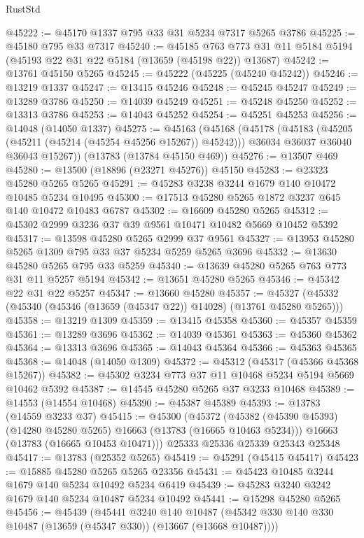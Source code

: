 \begin{lexlean}{RustStd}
\begin{coremodule}
@45222 := @45170 @1337 @795 @33 @31 @5234 @7317 @5265 @3786
@45225 := @45180 @795 @33 @7317
@45240 := @45185
    @763
    @773
    @31
    @11
    @5184
    @5194
    (@45193 @22 @31 @22 @5184 (@13659 (@45198 @22)) @13687)
@45242 := @13761 @45150 @5265
@45245 := @45222 (@45225 (@45240 @45242))
@45246 := @13219 @1337
@45247 := @13415 @45246
@45248 := @45245 @45247
@45249 := @13289 @3786
@45250 := @14039 @45249
@45251 := @45248 @45250
@45252 := @13313 @3786
@45253 := @14043 @45252
@45254 := @45251 @45253
@45256 := @14048 (@14050 @1337)
@45275 := @45163
    (@45168
      (@45178
        (@45183 (@45205 (@45211 (@45214 (@45254 @45256 @15267)) @45242)))
        @36034
        @36037
        @36040
        @36043
        @15267))
    (@13783 (@13784 @45150 @469))
@45276 := @13507 @469
@45280 := @13500 (@18896 (@23271 @45276)) @45150
@45283 := @23323 @45280 @5265 @5265
@45291 := @45283 @3238 @3244 @1679 @140 @10472 @10485 @5234 @10495
@45300 := @17513 @45280 @5265 @1872 @3237 @645 @140 @10472 @10483 @6787
@45302 := @16609 @45280 @5265
@45312 := @45302 @2999 @3236 @37 @39 @9561 @10471 @10482 @5669 @10452 @5392
@45317 := @13598 @45280 @5265 @2999 @37 @9561
@45327 := @13953 @45280 @5265 @1309 @795 @33 @37 @5234 @5259 @5265 @3696
@45332 := @13630 @45280 @5265 @795 @33 @5259
@45340 := @13639 @45280 @5265 @763 @773 @31 @11 @5257 @5194
@45342 := @13651 @45280 @5265
@45346 := @45342 @22 @31 @22 @5257
@45347 := @13660 @45280
@45357 := @45327 (@45332 (@45340 (@45346 (@13659 (@45347 @22)) @14028) (@13761 @45280 @5265)))
@45358 := @13219 @1309
@45359 := @13415 @45358
@45360 := @45357 @45359
@45361 := @13289 @3696
@45362 := @14039 @45361
@45363 := @45360 @45362
@45364 := @13313 @3696
@45365 := @14043 @45364
@45366 := @45363 @45365
@45368 := @14048 (@14050 @1309)
@45372 := @45312 (@45317 (@45366 @45368 @15267))
@45382 := @45302 @3234 @773 @37 @11 @10468 @5234 @5194 @5669 @10462 @5392
@45387 := @14545 @45280 @5265 @37 @3233 @10468
@45389 := @14553 (@14554 @10468)
@45390 := @45387 @45389
@45393 := @13783 (@14559 @3233 @37)
@45415 := @45300
    (@45372
      (@45382 (@45390 @45393) (@14280 @45280 @5265) @16663 (@13783 (@16665 @10463 @5234)))
      @16663
      (@13783 (@16665 @10453 @10471)))
    @25333
    @25336
    @25339
    @25343
    @25348
@45417 := @13783 (@25352 @5265)
@45419 := @45291 (@45415 @45417)
@45423 := @15885 @45280 @5265 @5265 @23356
@45431 := @45423 @10485 @3244 @1679 @140 @5234 @10492 @5234 @6419
@45439 := @45283 @3240 @3242 @1679 @140 @5234 @10487 @5234 @10492
@45441 := @15298 @45280 @5265
@45456 := @45439
    (@45441
      @3240
      @140
      @10487
      (@45342 @330 @140 @330 @10487 (@13659 (@45347 @330)) (@13667 (@13668 @10487))))

\end{coremodule}
\end{lexlean}
